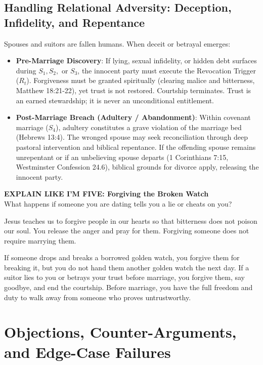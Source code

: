 \documentclass[11pt,twocolumn]{article}
\begin{document}
\subsection{Handling Relational Adversity: Deception, Infidelity, and Repentance}
Spouses and suitors are fallen humans. When deceit or betrayal emerges:
\begin{itemize}
    \item \textbf{Pre-Marriage Discovery}: If lying, sexual infidelity, or hidden debt surfaces during $S_1, S_2,$ or $S_3$, the innocent party must execute the Revocation Trigger ($R_t$). Forgiveness must be granted spiritually (clearing malice and bitterness, Matthew 18:21-22), yet trust is not restored. Courtship terminates. Trust is an earned stewardship; it is never an unconditional entitlement.
    \item \textbf{Post-Marriage Breach (Adultery / Abandonment)}: Within covenant marriage ($S_4$), adultery constitutes a grave violation of the marriage bed (Hebrews 13:4). The wronged spouse may seek reconciliation through deep pastoral intervention and biblical repentance. If the offending spouse remains unrepentant or if an unbelieving spouse departs (1 Corinthians 7:15, Westminster Confession 24.6), biblical grounds for divorce apply, releasing the innocent party.
\end{itemize}

\begin{eli5box}
\textbf{EXPLAIN LIKE I'M FIVE: Forgiving the Broken Watch}\\
What happens if someone you are dating tells you a lie or cheats on you? 

Jesus teaches us to forgive people in our hearts so that bitterness does not poison our soul. You release the anger and pray for them. Forgiving someone does not require marrying them. 

If someone drops and breaks a borrowed golden watch, you forgive them for breaking it, but you do not hand them another golden watch the next day. If a suitor lies to you or betrays your trust before marriage, you forgive them, say goodbye, and end the courtship. Before marriage, you have the full freedom and duty to walk away from someone who proves untrustworthy.
\end{eli5box}

\section{Objections, Counter-Arguments, and Edge-Case Failures}
\end{document}

